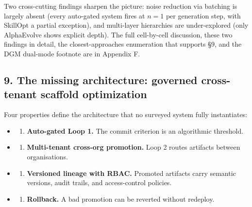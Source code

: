 Two cross-cutting findings sharpen the picture: noise reduction via
batching is largely absent (every auto-gated system fires at \(n = 1\)
per generation step, with SkillOpt a partial exception), and multi-layer
hierarchies are under-explored (only AlphaEvolve shows explicit depth).
The full cell-by-cell discussion, these two findings in detail, the
closest-approaches enumeration that supports §9, and the DGM dual-mode
footnote are in Appendix F.

\subsection{9. The missing architecture: governed cross-tenant scaffold
optimization}\label{the-missing-architecture-governed-cross-tenant-scaffold-optimization}

Four properties define the architecture that no surveyed system fully
instantiates:

\begin{itemize}
\tightlist
\item
  \begin{enumerate}
  \def\labelenumi{(\alph{enumi})}
  \tightlist
  \item
    \textbf{Auto-gated Loop 1.} The commit criterion is an algorithmic
    threshold.
  \end{enumerate}
\item
  \begin{enumerate}
  \def\labelenumi{(\alph{enumi})}
  \setcounter{enumi}{1}
  \tightlist
  \item
    \textbf{Multi-tenant cross-org promotion.} Loop 2 routes artifacts
    between organisations.
  \end{enumerate}
\item
  \begin{enumerate}
  \def\labelenumi{(\alph{enumi})}
  \setcounter{enumi}{2}
  \tightlist
  \item
    \textbf{Versioned lineage with RBAC.} Promoted artifacts carry
    semantic versions, audit trails, and access-control policies.
  \end{enumerate}
\item
  \begin{enumerate}
  \def\labelenumi{(\alph{enumi})}
  \setcounter{enumi}{3}
  \tightlist
  \item
    \textbf{Rollback.} A bad promotion can be reverted without redeploy.
  \end{enumerate}
\end{itemize}

